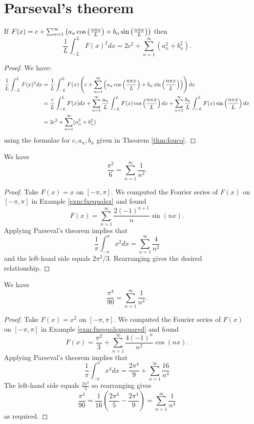 \section{Parseval's theorem}

\begin{thm}
If $F(x)=c+\sum_{n=1}^{\infty}\left(a_n\cos\left(\frac{n \pi x}{L}\right)+b_n\sin\left(\frac{n \pi x}{L}\right)\right)$ then
\[\frac{1}{L}\int_{-L}^LF(x)^2dx=2c^2+\sum_{n=1}^{\infty}(a^2_n+b^2_n).\]
\end{thm}
\begin{proof}
We have:
\begin{align*}
\frac{1}{L}\int_{-L}^LF(x)^2dx&=\frac{1}{L}\int_{-L}^LF(x)\left(c+\sum_{n=1}^{\infty}\left(a_n\cos\left(\frac{n \pi x}{L}\right)+b_n\sin\left(\frac{n \pi x}{L}\right)\right)\right)dx\\
     &=\frac{c}{L}\int_{-L}^LF(x)dx+\sum_{n=1}^{\infty}\frac{a_n}{L}\int_{-L}^LF(x)\cos\left(\frac{n \pi x}{L}\right)dx+\sum_{n=1}^{\infty}\frac{b_n}{L}\int_{-L}^LF(x)\sin\left(\frac{n \pi x}{L}\right)dx\\
&=2c^2+\sum_{n=1}^{\infty}(a^2_n+b^2_n)
\end{align*}
using the formulae for $c,a_n,b_n$ given in Theorem \ref{thm:fouco}.
\end{proof}

\begin{cor}
We have
\[\frac{\pi^2}{6}=\sum_{n=1}^{\infty}\frac{1}{n^2}.\]
\end{cor}
\begin{proof}
Take $F(x)=x$ on $[-\pi,\pi]$. We computed the Fourier series of $F(x)$ on $[-\pi,\pi]$ in Example \ref{exm:fxequalsx} and found
\[F(x)=\sum_{n=1}^{\infty}\frac{2(-1)^{n+1}}{n}\sin(nx).\]
Applying Parseval's theorem implies that
\[\frac{1}{\pi}\int_{-\pi}^{\pi}x^2dx=\sum_{n=1}^{\infty}\frac{4}{n^2}\]
and the left-hand side equals $2\pi^2/3$. Rearranging gives the desired relationship.
\end{proof}

\begin{cor}
We have
\[\frac{\pi^4}{90}=\sum_{n=1}^{\infty}\frac{1}{n^4}.\]
\end{cor}
\begin{proof}
Take $F(x)=x^2$ on $[-\pi,\pi]$. We computed the Fourier series of $F(x)$ on $[-\pi,\pi]$ in Example \ref{exm:fxequalsxsquared} and found
\[F(x)=\frac{\pi^2}{3}+\sum_{n=1}^{\infty}\frac{4(-1)^n}{n^2}\cos(nx).\]
Applying Parseval's theorem implies that
\[\frac{1}{\pi}\int_{-\pi}^{\pi}x^4dx=\frac{2\pi^4}{9}+\sum_{n=1}^{\infty}\frac{16}{n^4}\]
The left-hand side equals $\frac{2\pi^4}{5}$ so rearranging gives
\[\frac{\pi^4}{90}=\frac{1}{16}\left(\frac{2\pi^4}{5}-\frac{2\pi^4}{9}\right)=\sum_{n=1}^{\infty}\frac{1}{n^4}\]
as required.
\end{proof}

